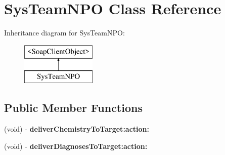 \hypertarget{interface_sys_team_n_p_o}{
\section{SysTeamNPO Class Reference}
\label{interface_sys_team_n_p_o}
}
Inheritance diagram for SysTeamNPO:\begin{figure}[H]
\begin{center}
\leavevmode
\includegraphics[height=2.000000cm]{interface_sys_team_n_p_o}
\end{center}
\end{figure}
\subsection*{Public Member Functions}
\begin{DoxyCompactItemize}
\item 
\hypertarget{interface_sys_team_n_p_o_a404e5848cc36c4d0b787d40bfd89a3b9}{
(void) -\/ {\bfseries deliverChemistryToTarget:action:}}
\label{interface_sys_team_n_p_o_a404e5848cc36c4d0b787d40bfd89a3b9}

\item 
\hypertarget{interface_sys_team_n_p_o_a78945ef1c90df7fc4746b7c396f1fdab}{
(void) -\/ {\bfseries deliverDiagnosesToTarget:action:}}
\label{interface_sys_team_n_p_o_a78945ef1c90df7fc4746b7c396f1fdab}

\end{DoxyCompactItemize}
